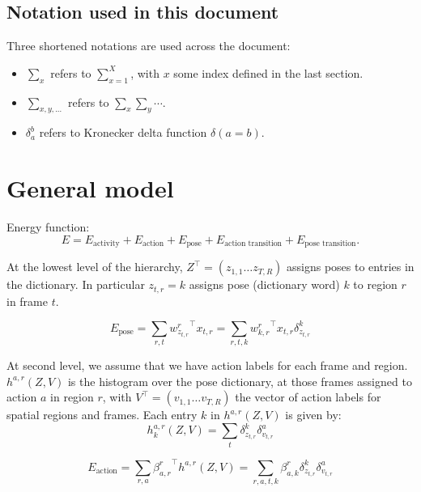\documentclass[10pt,letterpaper]{article}
\newcommand{\+}[1]{\ensuremath{{\boldsymbol #1}}}
\begin{document}
\subsection{Notation used in this document}
Three shortened notations are used across the document:
\begin{itemize}
\item $\sum_x$ refers to $\sum_{x=1}^X$, with $x$ some index defined in the last section.
\item $\sum_{x,y,...}$ refers to $\sum_x \sum_y \cdots$.
\item $\delta_a^b$ refers to Kronecker delta function $\delta(a = b)$.
\end{itemize}


\section{General model}

Energy function:
\begin{equation}
E = E_{\text{activity}} + E_{\text{action}} + E_{\text{pose}}
  + E_{\text{action transition}} + E_{\text{pose transition}}.
\end{equation}

At the lowest level of the hierarchy, $Z^\top = (z_{1,1} \dots
z_{T,R})$ assigns poses to entries in the
dictionary. In particular $z_{t,r}=k$ assigns pose (dictionary word) $k$ to
region $r$ in frame $t$. 

\begin{equation}
E_{\text{pose}} = \sum_{r,t} {w^r_{z_{t,r}}}^\top x_{t,r} = \sum_{r,t,k} {w^r_{k,r}}^\top x_{t,r} \delta_{z_{t,r}}^k
\end{equation}



At second level, we assume that we have action labels for each frame and region.
$h^{a,r}(Z, V)$ is the histogram over the pose
dictionary, at those frames assigned to action $a$ in region $r$, with $V^\top = (v_{1,1} \dots
v_{T,R})$ the vector of action labels for spatial regions and frames.
Each entry $k$ in
$h^{a,r}(Z,V)$ is given by:
\begin{equation}
\label{eq:histogram_poses_actions}
h_{k}^{a,r}(Z, V) =  \sum_{t} \delta_{z_{t,r}}^k \delta_{v_{t,r}}^a
\end{equation}

\begin{equation}
E_{\text{action}} = \sum_{r,a} {\beta^r_{a,r}}^\top h^{a,r}(Z, V) = \sum_{r,a,t,k} \beta^r_{a,k} \delta_{z_{t,r}}^k \delta_{v_{t,r}}^a
\end{equation}
\end{document}
